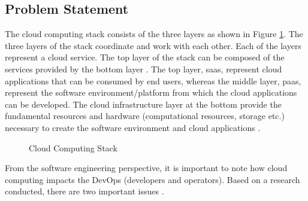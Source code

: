 \documentclass[article,type=msc,colorback,12pt,accentcolor=tud8b,table]{tudthesis}
\begin{document}
	\subsection{Problem Statement}	
	
The cloud computing stack consists of the three layers as shown in Figure \ref{fig:ccstack}. The three layers of the stack coordinate and work with each other. Each of the layers represent a cloud service. The top layer of the stack can be composed of the services provided by the bottom layer \cite{youseff2008toward}. The top layer, \gls{saas}, represent cloud applications that can be consumed by end users, whereas the middle layer, \gls{paas}, represent the software environment/platform from which the cloud applications can be developed. The cloud infrastructure layer at the bottom provide the fundamental resources and hardware (computational resources, storage etc.) necessary to create the software environment and cloud applications \cite{youseff2008toward}.  

 \begin{figure}
 \begin{center}
  \makebox[\textwidth]{\texttt{[image: 1-1]}}
\end{center}
\caption{Cloud Computing Stack}
\label{fig:ccstack}
\end{figure}

%	
%	
%	
	
 From the software engineering perspective, it is important to note how cloud computing impacts the DevOps (developers and operators). Based on a research conducted, there are two important issues \cite{cito2015making}. 
\end{document}
